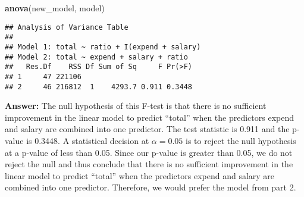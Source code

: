\documentclass[
]{article}
\newenvironment{Shaded}{\begin{snugshade}}{\end{snugshade}}
\newcommand{\FunctionTok}[1]{\textcolor[rgb]{0.13,0.29,0.53}{\textbf{#1}}}
\newcommand{\NormalTok}[1]{#1}
\begin{document}
\begin{enumerate}
\begin{Shaded}
\begin{Highlighting}[]
\FunctionTok{anova}\NormalTok{(new\_model, model)}
\end{Highlighting}
\end{Shaded}

\begin{verbatim}
## Analysis of Variance Table
## 
## Model 1: total ~ ratio + I(expend + salary)
## Model 2: total ~ expend + salary + ratio
##   Res.Df    RSS Df Sum of Sq     F Pr(>F)
## 1     47 221106                          
## 2     46 216812  1    4293.7 0.911 0.3448
\end{verbatim}

  \textbf{Answer:} The null hypothesis of this F-test is that there is
  no sufficient improvement in the linear model to predict ``total''
  when the predictors expend and salary are combined into one predictor.
  The test statistic is 0.911 and the p-value is 0.3448. A statistical
  decision at \(\alpha=0.05\) is to reject the null hypothesis at a
  p-value of less than 0.05. Since our p-value is greater than 0.05, we
  do not reject the null and thus conclude that there is no sufficient
  improvement in the linear model to predict ``total'' when the
  predictors expend and salary are combined into one predictor.
  Therefore, we would prefer the model from part 2.
\end{enumerate}
\end{document}

